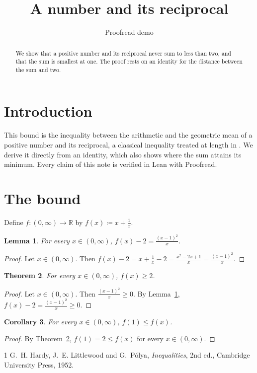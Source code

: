 \documentclass{article}
\title{A number and its reciprocal}
\author{Proofread demo}
\date{}
\newtheorem{lemma}{Lemma}
\newtheorem{theorem}[lemma]{Theorem}
\newtheorem{corollary}[lemma]{Corollary}
\begin{document}
\maketitle

\begin{abstract}
We show that a positive number and its reciprocal never sum to less than two, and that the sum is smallest at one.
The proof rests on an identity for the distance between the sum and two.
\end{abstract}

\section{Introduction}

This bound is the inequality between the arithmetic and the geometric mean of a positive number and its reciprocal, a classical inequality treated at length in \cite{hardy1952inequalities}.
We derive it directly from an identity, which also shows where the sum attains its minimum.
Every claim of this note is verified in Lean with Proofread.

\section{The bound}

Define $f:(0,\infty)\to\mathbb{R}$ by $f(x)\coloneqq x+\frac1x$.

\begin{lemma}\label{lem:identity}
For every $x\in(0,\infty)$, $f(x)-2=\frac{(x-1)^2}{x}$.
\end{lemma}

\begin{proof}
Let $x\in(0,\infty)$.
Then $f(x)-2=x+\frac1x-2=\frac{x^2-2x+1}{x}=\frac{(x-1)^2}{x}$.
\end{proof}

\begin{theorem}\label{thm:bound}
For every $x\in(0,\infty)$, $f(x)\ge2$.
\end{theorem}

\begin{proof}
Let $x\in(0,\infty)$.
Then $\frac{(x-1)^2}{x}\ge0$.
By Lemma~\ref{lem:identity}, $f(x)-2=\frac{(x-1)^2}{x}\ge0$.
\end{proof}

\begin{corollary}\label{cor:min}
For every $x\in(0,\infty)$, $f(1)\le f(x)$.
\end{corollary}

\begin{proof}
By Theorem~\ref{thm:bound}, $f(1)=2\le f(x)$ for every $x\in(0,\infty)$.
\end{proof}

\begin{thebibliography}{1}
 G.~H. Hardy, J.~E. Littlewood and G.~P\'olya, \emph{Inequalities}, 2nd ed., Cambridge University Press, 1952.
\end{thebibliography}
\end{document}
